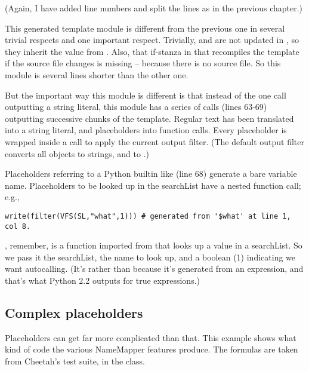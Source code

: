 (Again, I have added line numbers and split the lines as in the previous
chapter.)

This generated template module is different from the previous one in several
trivial respects and one important respect.  Trivially, 
 and  are not updated in 
, so they inherit the value  from 
.  Also, that if-stanza in  that recompiles the
template if the source file changes is missing -- because there is no source
file.  So this module is several lines shorter than the other one.

But the important way this module is different is that instead of the one
 call outputting a string literal, this module has a series of
 calls (lines 63-69) outputting successive chunks of the
template.  Regular text has been translated into a string literal, and
placeholders into function calls.  Every placeholder is wrapped inside a
 call to apply the current output filter.  (The default
output filter converts all objects to strings, and  to .)

Placeholders referring to a Python builtin like  (line 68)
generate a bare variable name.  Placeholders to be looked up in the searchList
have a nested function call; e.g.,
\begin{verbatim}
write(filter(VFS(SL,"what",1))) # generated from '$what' at line 1, col 8. 
\end{verbatim}
, remember, is a function imported from 
that looks up a value in a searchList.  So we pass it the searchList, the
name to look up, and a boolean (1) indicating we want autocalling.  (It's
 rather than  because it's generated from an
 expression, and that's what Python 2.2 outputs for true 
expressions.)

\subsection{Complex placeholders}
\label{placeholders.complex}

Placeholders can get far more complicated than that.  This example shows what
kind of code the various NameMapper features produce.  The formulas are
taken from Cheetah's test suite, in the
 class.  

